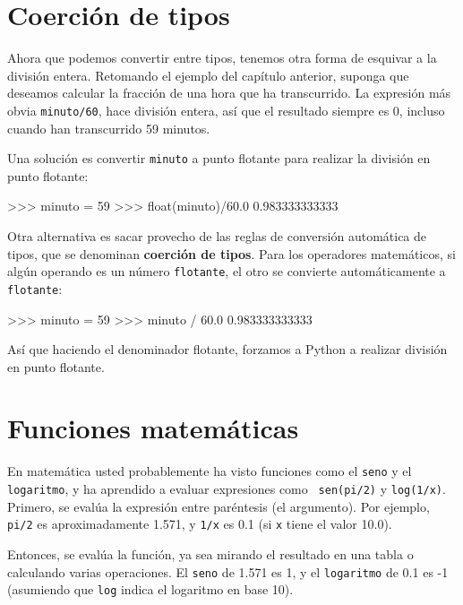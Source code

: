 \section{Coerción de tipos}

Ahora que podemos convertir entre tipos, tenemos otra forma de 
esquivar a la división entera. Retomando el ejemplo del capítulo
anterior, suponga que deseamos calcular la fracción de una hora
que ha transcurrido. La expresión más obvia \texttt{minuto/60}, 
hace división entera, así que el resultado siempre es 0, incluso
cuando han transcurrido 59 minutos.

Una solución es convertir \texttt{minuto} a punto flotante
para realizar la  división  en punto flotante:

\beforeverb
\begin{pyconcode}
>>> minuto = 59
>>> float(minuto)/60.0
0.983333333333
\end{pyconcode}
\afterverb
%

Otra alternativa es sacar provecho de las reglas de conversión
automática de tipos, que se denominan  {\bf coerción de tipos}.
Para los operadores matemáticos, si algún operando es un número
\texttt{flotante}, el otro se convierte automáticamente a \texttt{flotante}:

\beforeverb
\begin{pyconcode}
>>> minuto = 59
>>> minuto / 60.0
0.983333333333
\end{pyconcode}
\afterverb
%

Así que haciendo el denominador flotante, forzamos a Python a realizar
división en punto flotante.

\section{Funciones matemáticas}

En matemática usted probablemente ha visto funciones como el \texttt{seno} y el 
\texttt{logaritmo}, y ha aprendido a evaluar expresiones como {\tt
sen(pi/2)} y \texttt{log(1/x)}.  Primero, se evalúa la expresión entre 
paréntesis (el argumento).  Por ejemplo, \texttt{pi/2} es aproximadamente 
1.571, y \texttt{1/x} es 0.1 (si \texttt{x} tiene el valor 10.0).

Entonces, se evalúa la función, ya sea mirando el resultado en una tabla
o calculando varias operaciones. El \texttt{seno} de 1.571
es 1, y el \texttt{logaritmo} de 0.1 es -1 (asumiendo que \texttt{log}
indica el logaritmo en base 10).

